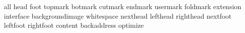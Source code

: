 

\unprotect


\startinterface all
              {head}
              {foot}
           {topmark}
           {botmark}
           {cutmark}
           {endmark}
          {usermark}
          {foldmark}
         {extension}
         {interface}
   {backgroundimage}
        {whitespace}
          {nexthead}
          {lefthead}
         {righthead}
          {nextfoot}
          {leftfoot}
         {rightfoot}
           {content}
       {backaddress}
          {optimize}
\stopinterface

